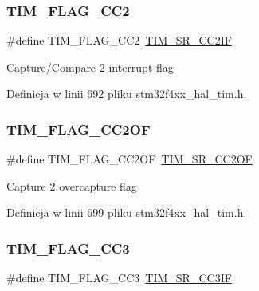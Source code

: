 \subsubsection{\texorpdfstring{T\+I\+M\+\_\+\+F\+L\+A\+G\+\_\+\+C\+C2}{TIM\_FLAG\_CC2}}
{\footnotesize\ttfamily \#define T\+I\+M\+\_\+\+F\+L\+A\+G\+\_\+\+C\+C2~\hyperlink{group___peripheral___registers___bits___definition_ga25a48bf099467169aa50464fbf462bd8}{T\+I\+M\+\_\+\+S\+R\+\_\+\+C\+C2\+IF}}

Capture/\+Compare 2 interrupt flag 

Definicja w linii 692 pliku stm32f4xx\+\_\+hal\+\_\+tim.\+h.

\mbox{\label{group___t_i_m___flag__definition_ga4df0c71d3e695c214d49802942e04590}} 
\subsubsection{\texorpdfstring{T\+I\+M\+\_\+\+F\+L\+A\+G\+\_\+\+C\+C2\+OF}{TIM\_FLAG\_CC2OF}}
{\footnotesize\ttfamily \#define T\+I\+M\+\_\+\+F\+L\+A\+G\+\_\+\+C\+C2\+OF~\hyperlink{group___peripheral___registers___bits___definition_ga3b7798da5863d559ea9a642af6658050}{T\+I\+M\+\_\+\+S\+R\+\_\+\+C\+C2\+OF}}

Capture 2 overcapture flag 

Definicja w linii 699 pliku stm32f4xx\+\_\+hal\+\_\+tim.\+h.

\mbox{\label{group___t_i_m___flag__definition_ga052c380f922219659810e4fceb574a7c}} 
\subsubsection{\texorpdfstring{T\+I\+M\+\_\+\+F\+L\+A\+G\+\_\+\+C\+C3}{TIM\_FLAG\_CC3}}
{\footnotesize\ttfamily \#define T\+I\+M\+\_\+\+F\+L\+A\+G\+\_\+\+C\+C3~\hyperlink{group___peripheral___registers___bits___definition_gad3cf234a1059c0a04799e88382cdc0f2}{T\+I\+M\+\_\+\+S\+R\+\_\+\+C\+C3\+IF}}

